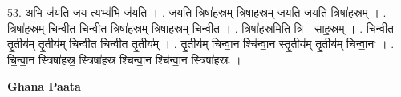 \documentclass[17pt]{extarticle}
\begin{document}
53. अ॒भि ज॑यति जय त्य॒भ्य॑भि ज॑यति । . ज॒य॒ति॒ त्रिषा॑हस्र॒म् त्रिषा॑हस्रम् जयति जयति॒ त्रिषा॑हस्रम् । . त्रिषा॑हस्रम् चिन्वीत चिन्वीत॒ त्रिषा॑हस्र॒म् त्रिषा॑हस्रम् चिन्वीत । . त्रिषा॑हस्र॒मिति॒ त्रि - सा॒ह॒स्र॒म् । . चि॒न्वी॒त॒ तृ॒तीय॑म् तृ॒तीय॑म् चिन्वीत चिन्वीत तृ॒तीय᳚म् । . तृ॒तीय॑म् चिन्वा॒न श्चि॑न्वा॒न स्तृ॒तीय॑म् तृ॒तीय॑म् चिन्वा॒नः । . चि॒न्वा॒न स्त्रिषा॑हस्र॒ स्त्रिषा॑हस्र श्चिन्वा॒न श्चि॑न्वा॒न स्त्रिषा॑हस्रः । \newline

\textbf{Ghana Paata } \newline
\end{document}
